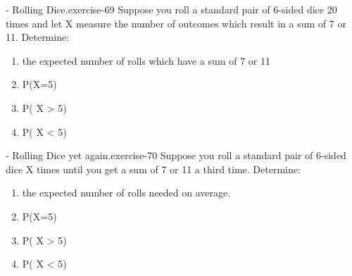 \documentclass[10pt,]{book}
\numberwithin{equation}{section}
\begin{document}
%
\par
\hypertarget{p-1012}{}%
\begin{inlineexercise}{- Rolling Dice.}{exercise-69}%
\hypertarget{p-1013}{}%
Suppose you roll a standard pair of 6-sided dice 20 times and let X measure the number of outcomes which result in a sum of 7 or 11. Determine: \leavevmode%
\begin{enumerate}
\item\hypertarget{li-280}{}the expected number of rolls which have a sum of 7 or 11%
\item\hypertarget{li-281}{}P(X=5)%
\item\hypertarget{li-282}{}P( X > 5)%
\item\hypertarget{li-283}{}P( X < 5)%
\end{enumerate}
%
\end{inlineexercise}
%
\par
\hypertarget{p-1014}{}%
\begin{inlineexercise}{- Rolling Dice yet again.}{exercise-70}%
\hypertarget{p-1015}{}%
Suppose you roll a standard pair of 6-sided dice X times until you get a sum of 7 or 11 a third time. Determine: \leavevmode%
\begin{enumerate}
\item\hypertarget{li-284}{}the expected number of rolls needed on average.%
\item\hypertarget{li-285}{}P(X=5)%
\item\hypertarget{li-286}{}P( X > 5)%
\item\hypertarget{li-287}{}P( X < 5)%
\end{enumerate}
%
\end{inlineexercise}
%
\par
\hypertarget{p-1016}{}%
\end{document}
